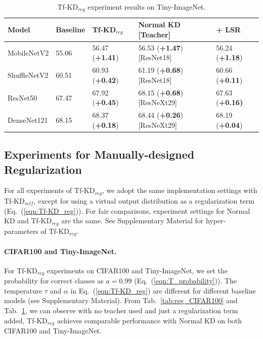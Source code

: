 \documentclass[10pt,twocolumn,letterpaper]{article}
\begin{document}
\begin{table}[h]
\renewcommand\arraystretch{1.1}
\centering
\caption{Tf-KD$_{reg}$ experiment results on Tiny-ImageNet.}
\small
\label{tab:reg_t_imagenet}
\begin{tabular}{lllll}
\hline
Model  & Baseline & Tf-KD$_{reg}$ & Normal KD [Teacher] & + LSR\\ \hline
MobileNetV2  &55.06 &56.47 (\textbf{+1.41}) & 56.53 (\textbf{+1.47}) [ResNet18] & 56.24 (\textbf{+1.18})\\ 
ShuffleNetV2 &60.51 & 60.93 (\textbf{+0.42}) &61.19 (\textbf{+0.68}) [ResNet18] & 60.66 (\textbf{+0.11})\\ 
ResNet50   &67.47 &67.92 (\textbf{+0.45}) &68.15 (\textbf{+0.68}) [ResNeXt29] &67.63 (\textbf{+0.16)}\\
DenseNet121 &68.15 &68.37 (\textbf{+0.18}) &68.44 (\textbf{+0.26}) [ResNeXt29] &68.19 (\textbf{+0.04})\\ \hline
\end{tabular}
\vspace{-15pt}
\end{table}


\subsection{Experiments for Manually-designed Regularization}
For all experiments of Tf-KD$_{reg}$, we adopt the same implementation settings with Tf-KD$_{self}$, except for using a virtual output distribution as a regularization term (Eq.~(\ref{eqn:Tf-KD_reg})). For fair comparisons, experiment settings for Normal KD and Tf-KD$_{reg}$ are the same. See Supplementary Material for hyper-parameters of Tf-KD$_{reg}$.
\vspace{-10pt}

\paragraph{CIFAR100 and Tiny-ImageNet.}  
For Tf-KD$_{reg}$ experiments on CIFAR100 and Tiny-ImageNet, we set the probability for correct classes as $a=0.99$ (Eq.~(\ref{eqn:T_probability})). The temperature $\tau$ and $\alpha$ in Eq.~(\ref{eqn:Tf-KD_reg}) are different for different baseline models (see Supplementary Material). From Tab.~\ref{tab:reg_CIFAR100} and Tab.~\ref{tab:reg_t_imagenet}, we can observe with no teacher used and just a regularization term added, Tf-KD$_{reg}$ achieves comparable performance with Normal KD on both CIFAR100 and Tiny-ImageNet. 
\vspace{-10pt}
\end{document}
